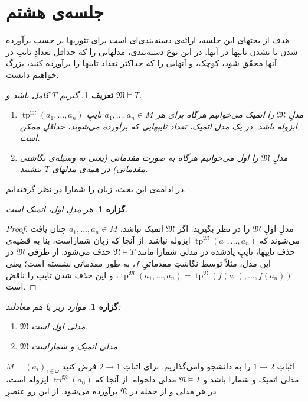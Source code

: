 \documentclass[12pt,a4paper]{report}
\theoremstyle{colorhead}
\newtheorem{prop}[thm]{گزاره}
\newtheorem{defn}[thm]{تعریف}
\DeclareMathOperator{\tp}{tp}
\begin{document}
\section{جلسه‌ی هشتم}
هدف از بحثهای این جلسه، ارائه‌ی دسته‌بندی‌ای است برای تئوریها بر حسب
برآورده شدن یا نشدن تایپها در آنها. در این نوع دسته‌بندی، مدلهایی را که حداقل
تعدادِ تایپ در آنها محقَق شود، کوچک، و آنهایی را که 
حداکثر تعداد تایپها را برآورده کنند، بزرگ خواهیم دانست. 
\begin{defn}
گیریم
$T$
کامل باشد و 
$\mathfrak{M}\models T$.
\begin{enumerate}
\item 
مدلِ
$\mathfrak{M}$
را 
اتمیک
می‌خوانیم هرگاه برای هر
$a_1,\ldots,a_n\in M$
تایپِ
$\tp^\mathfrak{M}(a_1,\ldots,a_n)$
ایزوله باشد. 
در یک مدل اتمیک، تعداد تایپهایی که برآورده می‌شوند، حداقلِ ممکن است. 
\item
مدلِ
 $\mathfrak{M}$
را اول 
می‌خوانیم هرگاه به صورت مقدماتی 
(یعنی به وسیله‌ی نگاشتی مقدماتی)
 در همه‌ی مدلهای
$T$
بنشیند.
\end{enumerate}
\end{defn}
در ادامه‌ی این بحث، زبان را شمارا در نظر گرفته‌ایم.
\begin{prop}
هر مدلِ اول، اتمیک است.
\end{prop}
\begin{proof}
مدلِ
اولِ
$\mathfrak{M}$
را در نظر بگیرید. اگر
$\mathfrak{M}$
اتمیک نباشد، 
$a_1,\ldots,a_n\in M$
چنان یافت می‌شوند که 
$\tp^\mathfrak{M}(a_1,\ldots,a_n)$
ایزوله نباشد. از آنجا که زبان شماراست، بنا به قضیه‌ی حذف تایپها،
تایپِ یادشده در
مدلی شمارا مانند
$\mathfrak{N}\models T$
حذف می‌شود. از طرفی
$\mathfrak{M}$
در این مدل، مثلاً توسط نگاشتِ
مقدماتیِ
$f$،
به طور مقدماتی نشسته است؛ یعنی
\mbox{$\tp^\mathfrak{M}(a_1,\ldots,a_n)=\tp^\mathfrak{N}(f(a_1),\ldots,f(a_n))$}،
و این حذف شدن تایپ را ناقض است. 
\end{proof}
\begin{prop}
موارد زیر با هم معادلند:
\begin{enumerate}
\item 
$\mathfrak{M}$
مدلی اول است.
\item 
$\mathfrak{M}$
مدلی اتمیک و شماراست.
\end{enumerate}
\end{prop}
اثباتِ 
$1\to 2$
را به دانشجو وامی‌گذاریم. برای اثباتِ
$2\to 1$
فرض کنید 
$M=(a_i)_{i\in \omega}$
مدلی اتمیک  و شمارا باشد و 
$\mathfrak{N}\models T$
مدلی دلخواه. از آنجا که
$\tp^\mathfrak{M}(a_0)$
ایزوله است، در هر مدلی و از جمله در
$\mathfrak{N}$
برآورده می‌شود. از این رو عنصرِ
\end{document}
